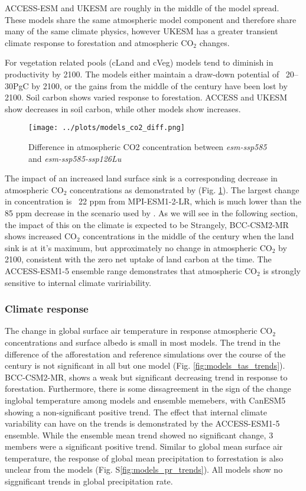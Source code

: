 \documentclass[]{article}
\begin{document}
ACCESS-ESM and UKESM are roughly in the middle of the model spread.
These models share the same atmospheric model component and therefore share many of the same climate physics, however UKESM has a greater transient climate response to forestation and atmospheric CO$_2$ changes.

For vegetation related pools (cLand and cVeg) models tend to diminish in productivity by 2100.
The models  either maintain a draw-down potential of ~20–30PgC by 2100, or the gains from the middle of the century have been lost by 2100.
Soil carbon shows varied response to forestation.
ACCESS and UKESM show decreases in soil carbon, while other models show increases.

\begin{figure}
    \centering
    \texttt{[image: ../plots/models\_co2\_diff.png]}
    \caption{Difference in atmospheric CO2 concentration between \textit{esm-ssp585} and \textit{esm-ssp585-ssp126Lu}}
    \label{fig:models_CO2}
\end{figure}

The impact of an increased land surface sink is a corresponding decrease in atmospheric CO$_2$ concentrations as demonstrated by (Fig. \ref{fig:models_CO2}).
The largest change in concentration is ~22 ppm from MPI-ESM1-2-LR, which is much lower than the 85 ppm decrease in the scenario used by \cite{sonntag_reforestation_2016}.
As we will see in the following section, the impact of this on the climate is expected to be 
Strangely, BCC-CSM2-MR shows increased CO$_2$ concentrations in the middle of the century when the land sink is at it's maximum, but approximately no change in atmospheric CO$_2$ by 2100, consistent with the zero net uptake of land carbon at the time.
The ACCESS-ESM1-5 ensemble range demonstrates that atmospheric CO$_2$ is strongly sensitive to internal climate variriability.

\subsubsection{Climate response}

The change in global surface air temperature in response atmospheric CO$_2$ concentrations and surface albedo is small in most models.
The trend in the difference of the afforestation and reference simulations over the course of the century is not significant in all but one model (Fig. \ref{fig:models_tas_trends}).
BCC-CSM2-MR, shows a weak but significant decreasing trend in response to forestation.
Furthermore, there is some dissagreement in the sign of the change inglobal temperature among models and ensemble memebers, with CanESM5 showing a non-significant positive trend.
The effect that internal climate variability can have on the trends is demonstrated by the ACCESS-ESM1-5 ensemble.
While the ensemble mean trend showed no significant change, 3 members were a significant positive trend.
Similar to global mean surface air temperature, the response of global mean precipitation to forrestation is also unclear from the models (Fig. S\ref{fig:models_pr_trends}).
All models show no siggnificant trends in global precipitation rate.
\end{document}
